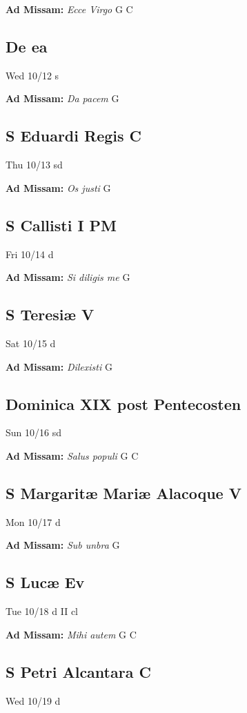 \documentclass[letterpaper, 10pt, twocolumn]{article}
\begin{document}
\textbf{Ad Missam:} \textit{Ecce Virgo} G C 

\subsection*{De ea}Wed 10/12 s

\textbf{Ad Missam:} \textit{Da pacem} G 

\subsection*{S Eduardi Regis C}Thu 10/13 sd

\textbf{Ad Missam:} \textit{Os justi} G 

\subsection*{S Callisti I PM}Fri 10/14 d

\textbf{Ad Missam:} \textit{Si diligis me} G 

\subsection*{S Teresiæ V}Sat 10/15 d

\textbf{Ad Missam:} \textit{Dilexisti} G 

\subsection*{Dominica XIX post Pentecosten}Sun 10/16 sd

\textbf{Ad Missam:} \textit{Salus populi} G C 

\subsection*{S Margaritæ Mariæ Alacoque V}Mon 10/17 d

\textbf{Ad Missam:} \textit{Sub unbra} G 

\subsection*{S Lucæ Ev}Tue 10/18 d II cl

\textbf{Ad Missam:} \textit{Mihi autem} G C 

\subsection*{S Petri Alcantara C}Wed 10/19 d
\end{document}
